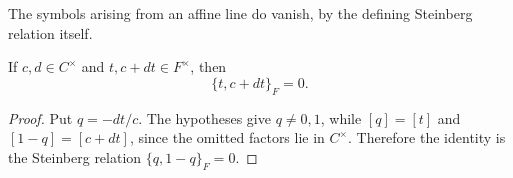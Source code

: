 The symbols arising from an affine line do vanish, by the defining
Steinberg relation itself.

\begin{lemma}\label{lem:affine-symbol}
If $c,d\in C^\times$ and $t,c+dt\in F^\times$, then
\[
 \{t,c+dt\}_F=0.
\]
\end{lemma}

\begin{proof}
Put $q=-dt/c$.  The hypotheses give $q\ne0,1$, while
$[q]=[t]$ and $[1-q]=[c+dt]$, since the omitted factors lie in
$C^\times$.  Therefore the identity is the Steinberg relation
$\{q,1-q\}_F=0$.
\end{proof}
